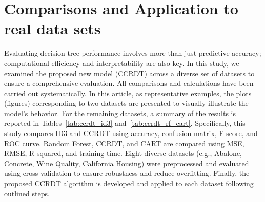 \documentclass[twoside]{article}
\begin{document}
\section{ Comparisons and Application to real data sets }

Evaluating decision tree performance involves more than just predictive accuracy; computational efficiency and interpretability are also key. In this study, we examined the proposed new model (CCRDT) across a diverse set of datasets to ensure a comprehensive evaluation. All comparisons and calculations have been carried out systematically. In this article, as representative examples, the plots (figures) corresponding to two datasets are presented to visually illustrate the model's behavior. For the remaining datasets, a summary of the results is reported in Tables~\ref{tab:ccrdt_id3} and~\ref{tab:ccrdt_rf_cart}. Specifically, this study compares ID3 and CCRDT using accuracy, confusion matrix, F-score, and ROC curve. Random Forest, CCRDT, and CART are compared using MSE, RMSE, R-squared, and training time. Eight diverse datasets (e.g., Abalone, Concrete, Wine Quality, California Housing) were preprocessed and evaluated using cross-validation to ensure robustness and reduce overfitting. Finally, the proposed CCRDT algorithm is developed and applied to each dataset following outlined steps.
\end{document}
